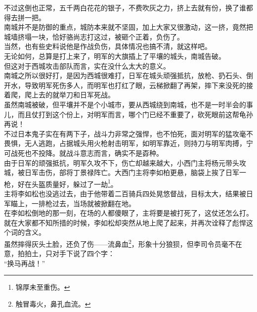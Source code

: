 \begin{multicols}{\theparacolNo}
不过这倒也正常，五千两白花花的银子，不费吹灰之力，挤上去就有份，换了谁都得去拼一把。\\

南城并不是防御的重点，城防本来就不坚固，加上大家又很激动，这一挤，竟然把城墙挤塌一块，恰好骆尚志打这过，被砸个正着，负伤了。\\

当然，也有些史料说他是作战负伤，具体情况也搞不清，就这样吧。\\

无论如何，总算是打上来了，明军的大旗插上了平壤的城头，南城告破。\\

但这对于西城攻击部队而言，实在没什么太大的意义。\\

南城之所以很好打，是因为西城很难打，日军在城头顽强抵抗，放枪、扔石头、倒开水，导致明军死伤多人，而明军也打红了眼，云梯掀翻了再架，摔下来没死的接着爬，爬上去的就举刀和日军死战。\\

虽然南城被破，但平壤并不是个小城市，要从西城绕到南城，也不是一时半会的事儿，而且仗打到这个份上，对明军而言，哪个门已经不重要了，砍死眼前这帮龟孙再说！\\

不过日本鬼子实在有两下子，战斗力非常之强悍，也不怕死，面对明军的猛攻毫不畏惧，无人逃跑，占据城头用火枪射击明军，如明军靠近，则持刀与明军肉搏，宁可战死也不投降。就战斗意志而言，确实不是孬种。\\

由于日军的顽强抵抗，明军久攻不下，伤亡却越来越大，小西门主将杨元带头攻城，被日军击伤，部将丁景禄阵亡。大西门主将李如柏更悬，脑袋上挨了日军一枪，好在头盔质量好，躲过了一劫\footnote{锦厚未至重伤。}。\\

主将李如松也没逃过去，由于他带着二百骑兵四处晃悠督战，目标太大，结果被日军瞄上，一排枪过去，当场就被掀翻在地。\\

在李如松倒地的那一刻，在场的人都傻眼了，主将要是被打死了，这仗还怎么打。\\

就在大家都不知所措的时候，李如松却突然从地上爬了起来，并再次诠释了彪悍这个词的含义。\\

虽然摔得灰头土脸，还负了伤——流鼻血\footnote{触冒毒火，鼻孔血流。}，形象十分狼狈，但李司令员毫不在意，拍拍土，只对手下说了四个字：\\

“换马再战！”\\


\end{multicols}
